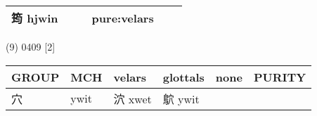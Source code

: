 \documentclass[14pt,a4paper]{scrartcl}
\begin{document}
\begin{longtable}[c]{@{}llllll@{}}
\begin{minipage}[t]{0.14\columnwidth}\raggedright\strut
筠 hjwin
\strut\end{minipage} &
\begin{minipage}[t]{0.14\columnwidth}\raggedright\strut
\strut\end{minipage} &
\begin{minipage}[t]{0.14\columnwidth}\raggedright\strut
\strut\end{minipage} &
\begin{minipage}[t]{0.14\columnwidth}\raggedright\strut
pure:velars
\strut\end{minipage}\tabularnewline
\bottomrule
\end{longtable}

(9) 0409 {[}2{]}

\begin{longtable}[c]{@{}llllll@{}}
\toprule
\begin{minipage}[b]{0.14\columnwidth}\raggedright\strut
GROUP
\strut\end{minipage} &
\begin{minipage}[b]{0.14\columnwidth}\raggedright\strut
MCH
\strut\end{minipage} &
\begin{minipage}[b]{0.14\columnwidth}\raggedright\strut
velars
\strut\end{minipage} &
\begin{minipage}[b]{0.14\columnwidth}\raggedright\strut
glottals
\strut\end{minipage} &
\begin{minipage}[b]{0.14\columnwidth}\raggedright\strut
none
\strut\end{minipage} &
\begin{minipage}[b]{0.14\columnwidth}\raggedright\strut
PURITY
\strut\end{minipage}\tabularnewline
\midrule
\endhead
\begin{minipage}[t]{0.14\columnwidth}\raggedright\strut
穴
\strut\end{minipage} &
\begin{minipage}[t]{0.14\columnwidth}\raggedright\strut
ywit
\strut\end{minipage} &
\begin{minipage}[t]{0.14\columnwidth}\raggedright\strut
泬 xwet
\strut\end{minipage} &
\begin{minipage}[t]{0.14\columnwidth}\raggedright\strut
鴥 ywit
\strut\end{minipage} &

\end{longtable}
\end{document}
